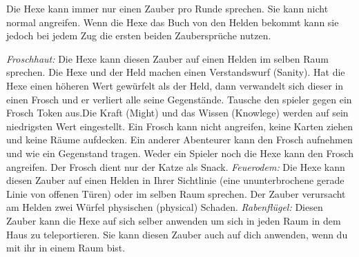 Die Hexe kann immer nur einen Zauber pro Runde sprechen. Sie kann nicht normal angreifen.
Wenn die Hexe das Buch von den Helden bekommt kann sie jedoch bei jedem Zug die ersten beiden Zaubersprüche nutzen.
  \begin{itemize}
        \bitem \emph{Froschhaut:} Die Hexe kann diesen Zauber auf einen Helden im selben Raum sprechen. Die Hexe und der Held machen einen Verstandswurf (Sanity). Hat die Hexe einen höheren Wert gewürfelt als der Held, dann verwandelt sich dieser in einen Frosch und er verliert alle seine Gegenstände. Tausche den spieler gegen ein Frosch Token aus.Die Kraft (Might) und das Wissen (Knowlege) werden auf sein niedrigsten Wert eingestellt. Ein Frosch kann nicht angreifen, keine Karten ziehen und keine Räume aufdecken. Ein anderer Abenteurer kann den Frosch aufnehmen und wie ein Gegenstand tragen. Weder ein Spieler noch die Hexe kann den Frosch angreifen. Der Frosch dient nur der Katze als Snack.
        \bitem \emph{Feuerodem:} Die Hexe kann diesen Zauber auf einen Helden in Ihrer Sichtlinie (eine ununterbrochene gerade Linie von offenen Türen) oder im selben Raum sprechen.
Der Zauber verursacht am Helden zwei Würfel physischen (physical) Schaden.
        \bitem \emph{Rabenflügel:} Diesen Zauber kann die Hexe auf sich selber anwenden um sich in jeden Raum in dem Haus zu teleportieren. Sie kann diesen Zauber auch auf dich anwenden, wenn du mit ihr in einem Raum bist.
    \end{itemize}


